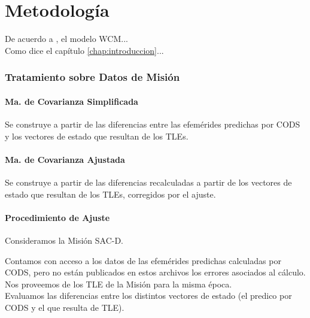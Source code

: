 \chapter{Metodología}
\label{chap:metodologia}

 De acuerdo a \cite{Barrett2009}, el modelo WCM...\\

 
 
  Como dice el capítulo \ref{chap:introduccion}...

\subsection{Tratamiento sobre Datos de Misi\'on}

\subsubsection{Ma. de Covarianza Simplificada}
Se construye a partir de las diferencias entre las efem\'erides predichas por CODS y los vectores de estado que resultan de los TLEs.\\


\subsubsection{Ma. de Covarianza Ajustada}
Se construye a partir de las diferencias recalculadas a partir de los vectores de estado que resultan de los TLEs, corregidos por el ajuste.\\


\subsubsection{Procedimiento de Ajuste}
Consideramos la Misi\'on SAC-D.

Contamos con acceso a los datos de las efem\'erides predichas calculadas por CODS, pero no están publicados en estos archivos los errores asociados al c\'alculo.\\
Nos proveemos de los TLE de la Misi\'on para la misma \'epoca.\\
Evaluamos las diferencias entre los distintos vectores de estado (el predico por CODS y el que resulta de TLE).\\

